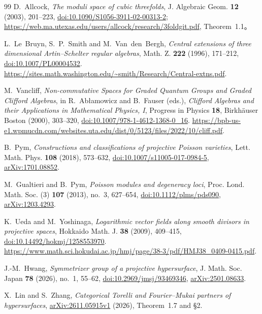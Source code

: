 \documentclass[11pt,a4paper]{ltjsarticle}
\numberwithin{equation}{section}
\begin{document}
\begin{thebibliography}{99}
D.~Allcock, \emph{The moduli space of cubic threefolds},
J. Algebraic Geom. \textbf{12} (2003), 201--223,
\href{https://doi.org/10.1090/S1056-3911-02-00313-2}{doi:10.1090/S1056-3911-02-00313-2};
\url{https://web.ma.utexas.edu/users/allcock/research/3foldgit.pdf}, Theorem~1.1。


L.~Le~Bruyn, S.~P.~Smith and M.~Van~den~Bergh,
\textit{Central extensions of three dimensional Artin--Schelter regular algebras},
Math. Z. \textbf{222} (1996), 171--212,
\href{https://doi.org/10.1007/PL00004532}{doi:10.1007/PL00004532}.
\url{https://sites.math.washington.edu/~smith/Research/Central-extns.pdf}.

M.~Vancliff,
\textit{Non-commutative Spaces for Graded Quantum Groups and Graded Clifford Algebras},
in R.~Ab{\l}amowicz and B.~Fauser (eds.),
\textit{Clifford Algebras and their Applications in Mathematical Physics, I},
Progress in Physics \textbf{18}, Birkh\"auser Boston (2000), 303--320,
\href{https://doi.org/10.1007/978-1-4612-1368-0_16}{doi:10.1007/978-1-4612-1368-0\_16}.
\url{https://bpb-us-e1.wpmucdn.com/websites.uta.edu/dist/0/5123/files/2022/10/cliff.pdf}.

B.~Pym,
\textit{Constructions and classifications of projective Poisson varieties},
Lett. Math. Phys. \textbf{108} (2018), 573--632,
\href{https://doi.org/10.1007/s11005-017-0984-5}{doi:10.1007/s11005-017-0984-5},
\href{https://arxiv.org/abs/1701.08852}{arXiv:1701.08852}.

M.~Gualtieri and B.~Pym,
\textit{Poisson modules and degeneracy loci},
Proc. Lond. Math. Soc. (3) \textbf{107} (2013), no.~3, 627--654,
\href{https://doi.org/10.1112/plms/pds090}{doi:10.1112/plms/pds090},
\href{https://arxiv.org/abs/1203.4293}{arXiv:1203.4293}.

K.~Ueda and M.~Yoshinaga,
\textit{Logarithmic vector fields along smooth divisors in projective spaces},
Hokkaido Math. J. \textbf{38} (2009), 409--415,
\href{https://doi.org/10.14492/hokmj/1258553970}{doi:10.14492/hokmj/1258553970}.
\url{https://www.math.sci.hokudai.ac.jp/hmj/page/38-3/pdf/HMJ38_0409-0415.pdf}.

J.-M.~Hwang,
\textit{Symmetrizer group of a projective hypersurface},
J. Math. Soc. Japan \textbf{78} (2026), no.~1, 55--62,
\href{https://doi.org/10.2969/jmsj/93469346}{doi:10.2969/jmsj/93469346},
\href{https://arxiv.org/abs/2501.08633}{arXiv:2501.08633}.

X.~Lin and S.~Zhang,
\emph{Categorical Torelli and Fourier--Mukai partners of hypersurfaces},
\href{https://arxiv.org/abs/2611.05915v1}{arXiv:2611.05915v1} (2026),
Theorem~1.7 and \S2.

\end{thebibliography}
\end{document}
